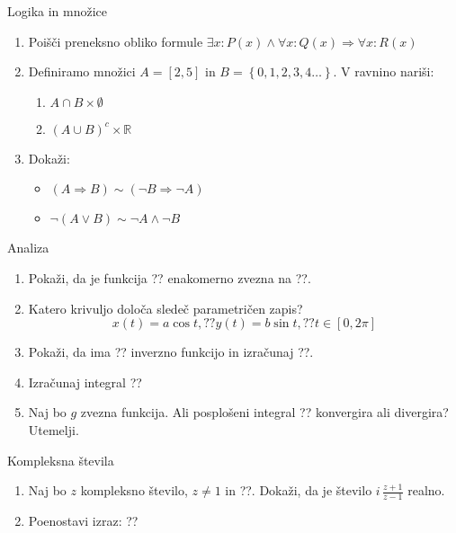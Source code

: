 \begin{frame}{Logika in množice}
	\begin{enumerate}
		\item
		Poišči preneksno obliko formule
		$\exists{x} : P(x) \land \forall{x} : Q(x) \Rightarrow  \forall{x} : R(x)$
		\item 
		Definiramo množici $A = [2,5]$ in $B = \left\{0,1,2,3,4\ldots\right\}$.
		V ravnino nariši:
		\begin{enumerate}
		   \item $A \cap  B \times \emptyset$
		   \item $(A \cup B)^c \times \mathbb{R}$
		\end{enumerate}
		\item
		Dokaži:
		\begin{itemize}
			\item $(A \Rightarrow B) \sim (\lnot B \Rightarrow \lnot A)$
			\item $\lnot (A \lor B) \sim \lnot A \land \lnot B$
		\end{itemize}
	\end{enumerate}
\end{frame}

\begin{frame}{Analiza}
	\begin{enumerate}
		\item
		Pokaži, da je funkcija ?? enakomerno zvezna na ??.
		\item 
		Katero krivuljo določa sledeč parametričen zapis?
		$$
		   x(t) = a \cos t, ?? %
		   y(t) = b \sin t, ?? %
		   t \in [0, 2 \pi]
		$$ 
		\item
		Pokaži, da ima ?? inverzno funkcijo in izračunaj ??.
		
		\item
		Izračunaj integral 
		??
		\item 
		Naj bo $g$ zvezna funkcija. Ali posplošeni integral 
		??
		konvergira ali divergira? Utemelji.
	\end{enumerate}
\end{frame}

\begin{frame}{Kompleksna števila}
	\begin{enumerate}
		\item
		Naj bo $z$ kompleksno število, $z \ne 1$ in ??.
		Dokaži, da je število \( i \, \frac{z+1}{z-1} \) realno.
		\item
		Poenostavi izraz:
		??
	\end{enumerate}
\end{frame}